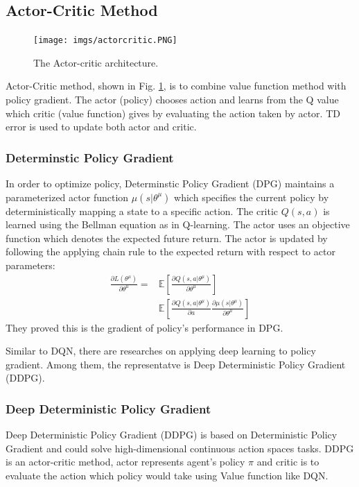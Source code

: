\documentclass[11pt,twocolumn]{jarticle} %
\begin{document}
\subsection{Actor-Critic Method}
\begin{figure}[h]
 \begin{center}
  \texttt{[image: imgs/actorcritic.PNG]}
  \caption{
  The Actor-critic architecture.
  }
  \label{fig:actorcritic}
 \end{center}
\end{figure}
Actor-Critic method, shown in Fig. \ref{fig:actorcritic}, is to combine value function method with policy gradient. The actor (policy) chooses action and learns from the Q value which critic (value function) gives by evaluating the action taken by actor. TD error is used to update both actor and critic.

\subsubsection{Determinstic Policy Gradient\cite{dpg}}

In order to optimize policy, Determinstic Policy Gradient (DPG) maintains a parameterized actor function $\mu(s|\theta^\mu)$ which specifies the current policy by deterministically mapping a state to a specific action. The critic $Q(s, a)$ is learned using the Bellman equation as in Q-learning. The actor uses an objective function which denotes the expected future return. The actor is updated by following the applying chain rule to the expected return with respect to actor parameters:
\begin{equation}
\begin{split}
\frac{\partial L(\theta^\mu)}{\partial \theta^\mu} = 
& \mathbb{E}[\frac{\partial Q(s, a|\theta^\mu)}{\partial \theta^\mu}] \\
& \mathbb{E}[\frac{\partial Q(s, a|\theta^\mu)}{\partial a} \frac{\partial \mu(s|\theta^\mu)}{\partial \theta^\mu}]
\end{split}
\end{equation}
They proved this is the gradient of policy's performance in DPG\cite{dpg}. \par

Similar to DQN, there are researches on applying deep learning to policy gradient. Among them, the representatve is Deep Deterministic Policy Gradient (DDPG)\cite{ddpg}. 

\subsubsection{Deep Deterministic Policy Gradient\cite{ddpg}}
Deep Deterministic Policy Gradient (DDPG) is based on Deterministic Policy Gradient\cite{dpg} and could solve high-dimensional continuous action spaces tasks. DDPG is an actor-critic method, actor represents agent's policy $\pi$ and critic is to evaluate the action which policy would take using Value function like DQN. 
\end{document}
